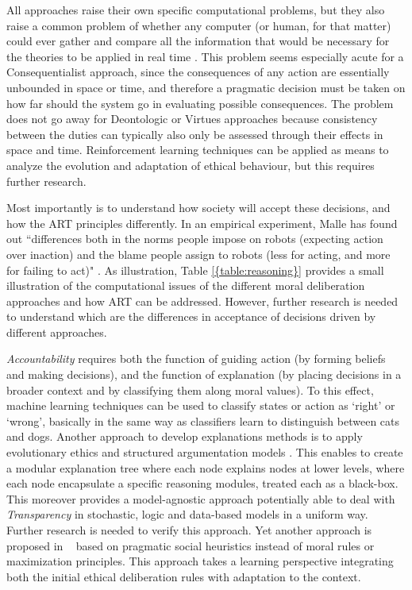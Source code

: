 \documentclass[twocolumn]{article}
\begin{document}
All approaches raise their own specific computational problems, but they also raise a common problem of whether any computer (or human, for that matter) could ever gather and compare all the information that would be necessary for the theories to be applied in real time \cite{allen2005artificial}. This problem seems especially acute for a Consequentialist approach, since the consequences of any action are essentially unbounded in space or time, and therefore a pragmatic decision must be taken on how far should the system go in evaluating possible consequences. The problem does not go away for Deontologic or Virtues approaches because consistency between the duties can typically also only be assessed through their effects in space and time. Reinforcement learning techniques can be applied as means to analyze the evolution and adaptation of ethical behaviour, but this requires further research.

Most importantly is to understand how society will accept these decisions, and how the ART principles differently. In an empirical experiment, Malle has found out ``differences both in the norms people impose on robots (expecting action over inaction) and the blame people assign to robots (less for acting, and more for failing to act)" \cite{malle2015sacrifice}. As illustration, Table \ref{{table:reasoning}} provides a small illustration of the computational issues of the different moral deliberation approaches and how ART can be addressed.  However, further research is needed to understand which are the differences in acceptance of decisions driven by different approaches. 

\textit{Accountability} requires 
both the function of guiding action (by forming beliefs and making decisions), and the function of explanation (by placing decisions in a broader context and by classifying them along moral values). To this effect, machine learning techniques can be used to classify  states or action as `right' or `wrong', basically in the same way as classifiers learn to distinguish between cats and dogs. Another approach to develop explanations methods 
is to apply evolutionary ethics \cite{binmore2005natural} and structured argumentation models \cite{prakken2013}. This enables to create a modular explanation tree where each node explains nodes at lower levels, where each node encapsulate a specific reasoning modules, treated each as a black-box. This moreover provides a model-agnostic approach potentially able to deal with \textit{Transparency} in stochastic, logic and data-based models in a uniform way. Further research is needed to verify this approach. Yet another approach is proposed in ~\cite{gigerenzer2010moral} based on pragmatic social heuristics instead of moral rules or maximization principles. This approach takes a learning perspective integrating both the initial ethical deliberation rules with adaptation to the context.
\end{document}
